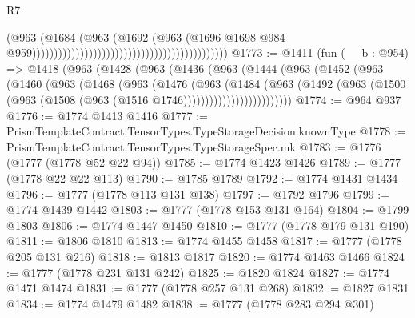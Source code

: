\begin{lexlean}{R7}
\begin{coremodule}
                                                                                  (@963
                                                                                    (@1684
                                                                                      (@963
                                                                                        (@1692
                                                                                          (@963
                                                                                            (@1696
                                                                                              @1698
                                                                                              @984
                                                                                              @959)))))))))))))))))))))))))))))))))))))))))))))
@1773 := @1411
    (fun (__b : @954) =>
    @1418
      (@963
        (@1428
          (@963
            (@1436
              (@963
                (@1444
                  (@963
                    (@1452
                      (@963
                        (@1460
                          (@963
                            (@1468
                              (@963
                                (@1476
                                  (@963
                                    (@1484
                                      (@963
                                        (@1492
                                          (@963
                                            (@1500
                                              (@963
                                                (@1508 (@963 (@1516 @1746)))))))))))))))))))))))))
@1774 := @964 @937
@1776 := @1774 @1413 @1416
@1777 := PrismTemplateContract.TensorTypes.TypeStorageDecision.knownType
@1778 := PrismTemplateContract.TensorTypes.TypeStorageSpec.mk
@1783 := @1776 (@1777 (@1778 @52 @22 @94))
@1785 := @1774 @1423 @1426
@1789 := @1777 (@1778 @22 @22 @113)
@1790 := @1785 @1789
@1792 := @1774 @1431 @1434
@1796 := @1777 (@1778 @113 @131 @138)
@1797 := @1792 @1796
@1799 := @1774 @1439 @1442
@1803 := @1777 (@1778 @153 @131 @164)
@1804 := @1799 @1803
@1806 := @1774 @1447 @1450
@1810 := @1777 (@1778 @179 @131 @190)
@1811 := @1806 @1810
@1813 := @1774 @1455 @1458
@1817 := @1777 (@1778 @205 @131 @216)
@1818 := @1813 @1817
@1820 := @1774 @1463 @1466
@1824 := @1777 (@1778 @231 @131 @242)
@1825 := @1820 @1824
@1827 := @1774 @1471 @1474
@1831 := @1777 (@1778 @257 @131 @268)
@1832 := @1827 @1831
@1834 := @1774 @1479 @1482
@1838 := @1777 (@1778 @283 @294 @301)

\end{coremodule}
\end{lexlean}
